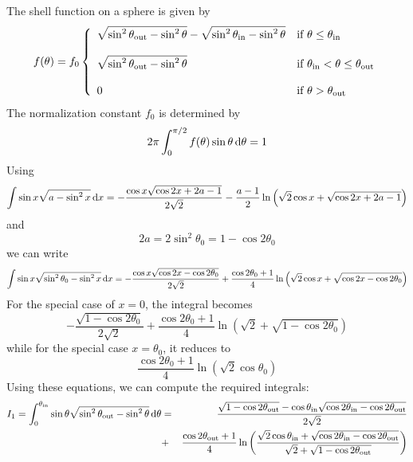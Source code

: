 \documentclass{article}[12pt,a4]
\begin{document}
The shell function on a sphere is given by
\begin{equation}
f(\theta) = f_0 \left \{
   \begin{array}{l l}
      \displaystyle
      \sqrt{ \sin^2 \theta_{\rm out} - \sin^2 \theta } - \sqrt{ \sin^2 \theta_{\rm in} - \sin^2 \theta }
      & \mbox{if $\theta \le \theta_{\rm in}$} \\
      \\
     \displaystyle
      \sqrt{ \sin^2 \theta_{\rm out} - \sin^2 \theta }
      & \mbox{if $\theta_{\rm in} < \theta \le \theta_{\rm out}$} \\
      \\
     \displaystyle
     0 & \mbox{if $\theta > \theta_{\rm out}$}
   \end{array}
   \right .
\end{equation}
The normalization constant $f_0$ is determined by
\begin{equation}
2 \pi \int_0^{\pi/2} f(\theta) \sin \theta \, {\rm d}\theta = 1
\end{equation}
Using
\begin{equation}
\int \sin x \sqrt {a - \sin^2 x} \, {\rm d}x = 
-\frac{\cos x \sqrt{\cos 2x + 2a-1}}{2 \sqrt{2}}
-\frac{a-1}{2} \ln \left( \sqrt{2} \cos x + \sqrt{\cos 2x + 2a-1} \right)
\end{equation}
and
\begin{equation}
2 a = 2\sin^2 \theta_0 = 1-\cos 2 \theta_0
\end{equation}
we can write
\begin{equation}
\int \sin x \sqrt {\sin^2 \theta_0 - \sin^2 x} \, {\rm d}x =
-\frac{\cos x \sqrt{\cos 2x - \cos 2\theta_0}}{2 \sqrt{2}}
+\frac{\cos 2\theta_0+1}{4} \ln \left( \sqrt{2} \cos x + \sqrt{\cos 2x - \cos 2\theta_0} \right)
\end{equation}
For the special case of $x=0$, the integral becomes
\begin{equation}
-\frac{\sqrt{1 - \cos 2\theta_0}}{2 \sqrt{2}}
+\frac{\cos 2\theta_0+1}{4} \ln \left( \sqrt{2} + \sqrt{1 - \cos 2\theta_0} \right)
\end{equation}
while for the special case $x=\theta_0$, it reduces to
\begin{equation}
\frac{\cos 2\theta_0+1}{4} \ln \left( \sqrt{2} \cos \theta_0 \right)
\end{equation}
Using these equations, we can compute the required integrals:
\begin{eqnarray}
I_1 = \int_0^{\theta_{\rm in}} \sin \theta \sqrt {\sin^2 \theta_{\rm out} - \sin^2 \theta} \, {\rm d}\theta & = &
\frac{\sqrt{1 - \cos 2\theta_{\rm out}} - 
               \cos \theta_{\rm in} \sqrt{\cos 2\theta_{\rm in} - \cos 2\theta_{\rm out}}}
              {2 \sqrt{2}} \nonumber \\
& + & \frac{\cos 2\theta_{\rm out}+1}{4} \ln 
\left( 
\frac{\sqrt{2} \cos \theta_{\rm in} + \sqrt{\cos 2\theta_{\rm in} - \cos 2\theta_{\rm out}}}
        {\sqrt{2} + \sqrt{1 - \cos 2\theta_{\rm out}}} 
\right)
\end{eqnarray}
\end{document}
